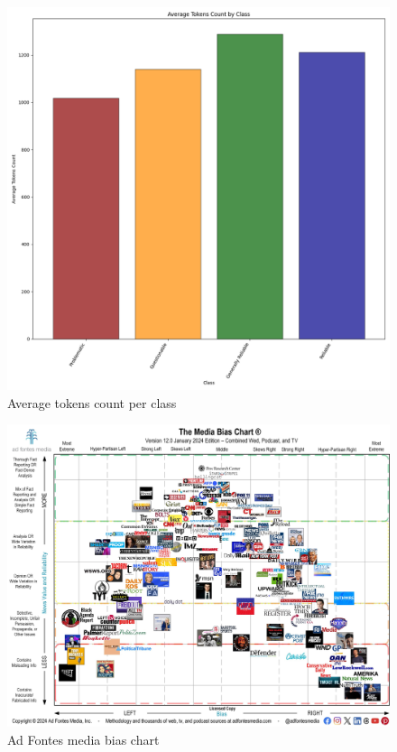 \begin{figure}[htbp]
    \centering
    \includegraphics[width=0.8\linewidth]{figures/tokens_count_vx_per_class_hist.png}
    \caption{Average tokens count per class}
    \label{fig:avg_tokens_count_per_class}
\end{figure}


\begin{figure}[htbp]
    \centering
    \includegraphics[width=0.8\linewidth]{images/Media-Bias-Chart-12.0_Jan-2024-Licensed-scaled.jpg}
    \caption{Ad Fontes media bias chart}
    \label{fig:adfontes-media-bias-chart}
\end{figure}


